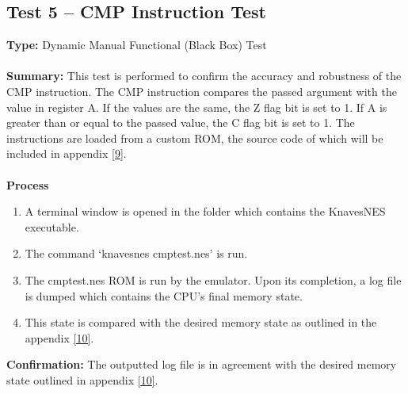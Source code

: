 \documentclass[12pt]{article}
\begin{document}
	\subsection{Test 5 – CMP Instruction Test}
		\textbf{Type: } Dynamic Manual Functional (Black Box) Test\\\\
		\textbf{Summary: } This test is performed to confirm the accuracy and robustness of the CMP instruction. The CMP instruction compares the passed argument with the value in register A. If the values are the same, the Z flag bit is set to 1. If A is greater than or equal to the passed value, the C flag bit is set to 1. The instructions are loaded from a custom ROM, the source code of which will be included in appendix \hyperlink{appendix}{[9]}.\\\\
		\textbf{Process}
			\begin{enumerate}
				\item A terminal window is opened in the folder which contains the KnavesNES executable.
				\item The command ‘knavesnes cmptest.nes’ is run.
				\item The cmptest.nes ROM is run by the emulator. Upon its completion, a log file is dumped which contains the CPU’s final memory state.
				\item This state is compared with the desired memory state as outlined in the appendix \hyperlink{appendix}{[10]}.
			\end{enumerate}
		\textbf{Confirmation: } The outputted log file is in agreement with the desired memory state outlined in appendix \hyperlink{appendix}{[10]}.
\end{document}
